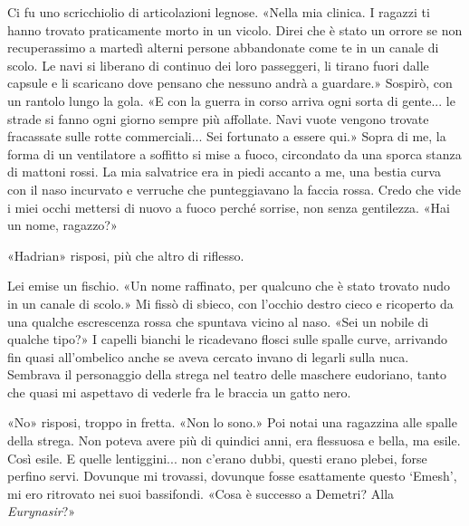 Ci fu uno scricchiolio di articolazioni legnose. «Nella mia clinica. I
ragazzi ti hanno trovato praticamente morto in un vicolo. Direi che è
stato un orrore se non recuperassimo a martedì alterni persone
abbandonate come te in un canale di scolo. Le navi si liberano di
continuo dei loro passeggeri, li tirano fuori dalle capsule e li
scaricano dove pensano che nessuno andrà a guardare.» Sospirò, con un
rantolo lungo la gola. «E con la guerra in corso arriva ogni sorta di
gente... le strade si fanno ogni giorno sempre più affollate. Navi vuote
vengono trovate fracassate sulle rotte commerciali... Sei fortunato a
essere qui.» Sopra di me, la forma di un ventilatore a soffitto si mise
a fuoco, circondato da una sporca stanza di mattoni rossi. La mia
salvatrice era in piedi accanto a me, una bestia curva con il naso
incurvato e verruche che punteggiavano la faccia rossa. Credo che vide i
miei occhi mettersi di nuovo a fuoco perché sorrise, non senza
gentilezza. «Hai un nome, ragazzo?»

«Hadrian» risposi, più che altro di riflesso.

Lei emise un fischio. «Un nome raffinato, per qualcuno che è stato
trovato nudo in un canale di scolo.» Mi fissò di sbieco, con l'occhio
destro cieco e ricoperto da una qualche escrescenza rossa che spuntava
vicino al naso. «Sei un nobile di qualche tipo?» I capelli bianchi le
ricadevano flosci sulle spalle curve, arrivando fin quasi all'ombelico
anche se aveva cercato invano di legarli sulla nuca. Sembrava il
personaggio della strega nel teatro delle maschere eudoriano, tanto che
quasi mi aspettavo di vederle fra le braccia un gatto nero.

«No» risposi, troppo in fretta. «Non lo sono.» Poi notai una ragazzina
alle spalle della strega. Non poteva avere più di quindici anni, era
flessuosa e bella, ma esile. Così esile. E quelle lentiggini... non
c'erano dubbi, questi erano plebei, forse perfino servi. Dovunque mi
trovassi, dovunque fosse esattamente questo `Emesh', mi ero ritrovato
nei suoi bassifondi. \emph{} «Cosa è successo a Demetri? Alla
\emph{Eurynasir}?»

